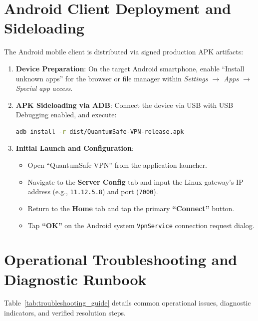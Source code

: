 \section{Android Client Deployment and Sideloading}
\label{sec:android_client_deployment}

The Android mobile client is distributed via signed production APK artifacts:
\begin{enumerate}
    \item \textbf{Device Preparation}: On the target Android smartphone, enable ``Install unknown apps'' for the browser or file manager within \textit{Settings $\to$ Apps $\to$ Special app access}.
    \item \textbf{APK Sideloading via ADB}: Connect the device via USB with USB Debugging enabled, and execute:
    \begin{lstlisting}[language=bash, caption={ADB Sideload Installation Command.}]
adb install -r dist/QuantumSafe-VPN-release.apk
    \end{lstlisting}
    \item \textbf{Initial Launch and Configuration}:
    \begin{itemize}
        \item Open ``QuantumSafe VPN'' from the application launcher.
        \item Navigate to the \textbf{Server Config} tab and input the Linux gateway's IP address (e.g., \texttt{11.12.5.8}) and port (\texttt{7000}).
        \item Return to the \textbf{Home} tab and tap the primary \textbf{``Connect''} button.
        \item Tap \textbf{``OK''} on the Android system \texttt{VpnService} connection request dialog.
    \end{itemize}
\end{enumerate}

\section{Operational Troubleshooting and Diagnostic Runbook}
\label{sec:troubleshooting_runbook}

Table~\ref{tab:troubleshooting_guide} details common operational issues, diagnostic indicators, and verified resolution steps.

